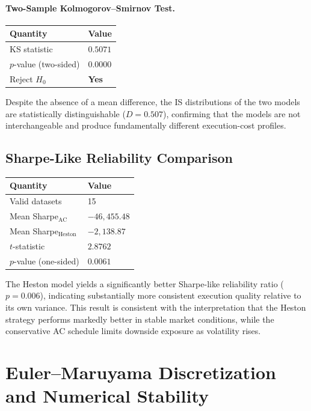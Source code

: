 \documentclass[11pt]{article}
\begin{document}
\paragraph{Two-Sample Kolmogorov--Smirnov Test.}
\begin{center}
\begin{tabular}{ll}
\toprule
Quantity & Value \\
\midrule
KS statistic & $0.5071$ \\
$p$-value (two-sided) & $0.0000$ \\
Reject $H_0$ & \textbf{Yes} \\
\bottomrule
\end{tabular}
\end{center}
Despite the absence of a mean difference, the IS distributions of the two models are statistically distinguishable ($D = 0.507$), confirming that the models are not interchangeable and produce fundamentally different execution-cost profiles.

\subsection{Sharpe-Like Reliability Comparison}

\begin{center}
\begin{tabular}{ll}
\toprule
Quantity & Value \\
\midrule
Valid datasets & 15 \\
Mean Sharpe$_{\mathrm{AC}}$ & $-46{,}455.48$ \\
Mean Sharpe$_{\mathrm{Heston}}$ & $-2{,}138.87$ \\
$t$-statistic & $2.8762$ \\
$p$-value (one-sided) & $0.0061$ \\
\bottomrule
\end{tabular}
\end{center}

The Heston model yields a significantly better Sharpe-like reliability ratio ($p = 0.006$), indicating substantially more consistent execution quality relative to its own variance. This result is consistent with the interpretation that the Heston strategy performs markedly better in stable market conditions, while the conservative AC schedule limits downside exposure as volatility rises.

\appendix

\section{Euler--Maruyama Discretization and Numerical Stability}
\label{app:euler}
\end{document}
